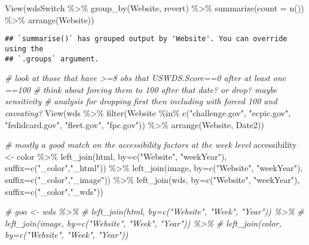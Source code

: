 \documentclass[
]{article}
\newenvironment{Shaded}{\begin{snugshade}}{\end{snugshade}}
\newcommand{\AttributeTok}[1]{\textcolor[rgb]{0.77,0.63,0.00}{#1}}
\newcommand{\CommentTok}[1]{\textcolor[rgb]{0.56,0.35,0.01}{\textit{#1}}}
\newcommand{\FunctionTok}[1]{\textcolor[rgb]{0.00,0.00,0.00}{#1}}
\newcommand{\NormalTok}[1]{#1}
\newcommand{\OtherTok}[1]{\textcolor[rgb]{0.56,0.35,0.01}{#1}}
\newcommand{\SpecialCharTok}[1]{\textcolor[rgb]{0.00,0.00,0.00}{#1}}
\newcommand{\StringTok}[1]{\textcolor[rgb]{0.31,0.60,0.02}{#1}}
\begin{document}
\begin{Shaded}
\begin{Highlighting}[]
\FunctionTok{View}\NormalTok{(wdsSwitch }\SpecialCharTok{\%\textgreater{}\%} 
  \FunctionTok{group\_by}\NormalTok{(Website, revert) }\SpecialCharTok{\%\textgreater{}\%}
  \FunctionTok{summarize}\NormalTok{(}\AttributeTok{count =} \FunctionTok{n}\NormalTok{()) }\SpecialCharTok{\%\textgreater{}\%}
  \FunctionTok{arrange}\NormalTok{(Website))}
\end{Highlighting}
\end{Shaded}

\begin{verbatim}
## `summarise()` has grouped output by 'Website'. You can override using the
## `.groups` argument.
\end{verbatim}

\begin{Shaded}
\begin{Highlighting}[]
\CommentTok{\# look at those that have \textgreater{}=8 obs that USWDS.Score==0 after at least one ==100}
\CommentTok{\# think about forcing them to 100 after that date? or drop? maybe sensitivity }
\CommentTok{\# analysis for dropping first then including with forced 100 and caveating?}
\FunctionTok{View}\NormalTok{(wds }\SpecialCharTok{\%\textgreater{}\%}
  \FunctionTok{filter}\NormalTok{(Website }\SpecialCharTok{\%in\%} \FunctionTok{c}\NormalTok{(}\StringTok{"challenge.gov"}\NormalTok{, }\StringTok{"ecpic.gov"}\NormalTok{, }\StringTok{"fedidcard.gov"}\NormalTok{, }
    \StringTok{"fleet.gov"}\NormalTok{, }\StringTok{"fpc.gov"}\NormalTok{)) }\SpecialCharTok{\%\textgreater{}\%}
  \FunctionTok{arrange}\NormalTok{(Website, Date2))}

\CommentTok{\# mostly a good match on the accessibility factors at the week level}
\NormalTok{accessibility }\OtherTok{\textless{}{-}}\NormalTok{ color }\SpecialCharTok{\%\textgreater{}\%}
  \FunctionTok{left\_join}\NormalTok{(html, }\AttributeTok{by=}\FunctionTok{c}\NormalTok{(}\StringTok{"Website"}\NormalTok{, }\StringTok{"weekYear"}\NormalTok{), }\AttributeTok{suffix=}\FunctionTok{c}\NormalTok{(}\StringTok{"\_color"}\NormalTok{,}\StringTok{"\_html"}\NormalTok{)) }\SpecialCharTok{\%\textgreater{}\%}
  \FunctionTok{left\_join}\NormalTok{(image, }\AttributeTok{by=}\FunctionTok{c}\NormalTok{(}\StringTok{"Website"}\NormalTok{, }\StringTok{"weekYear"}\NormalTok{), }\AttributeTok{suffix=}\FunctionTok{c}\NormalTok{(}\StringTok{"\_color"}\NormalTok{,}\StringTok{"\_image"}\NormalTok{)) }\SpecialCharTok{\%\textgreater{}\%}
  \FunctionTok{left\_join}\NormalTok{(wds, }\AttributeTok{by=}\FunctionTok{c}\NormalTok{(}\StringTok{"Website"}\NormalTok{, }\StringTok{"weekYear"}\NormalTok{), }\AttributeTok{suffix=}\FunctionTok{c}\NormalTok{(}\StringTok{"\_color"}\NormalTok{,}\StringTok{"\_wds"}\NormalTok{)) }

\CommentTok{\# goo \textless{}{-} wds \%\textgreater{}\%}
\CommentTok{\#   left\_join(html, by=c("Website", "Week", "Year")) \%\textgreater{}\%}
\CommentTok{\#   left\_join(image, by=c("Website", "Week", "Year")) \%\textgreater{}\%}
\CommentTok{\#   left\_join(color, by=c("Website", "Week", "Year"))}
\end{Highlighting}
\end{Shaded}
\end{document}

